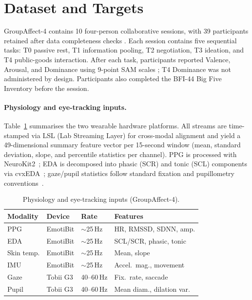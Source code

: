 \documentclass[sigconf,review,anonymous]{acmart}
\begin{document}
\section{Dataset and Targets}
\label{sec:dataset}

GroupAffect-4 contains 10 four-person collaborative sessions, with 39
participants retained after data completeness checks \cite{groupaffect4}.
Each session contains five sequential tasks: T0 passive rest, T1 information
pooling, T2 negotiation, T3 ideation, and T4 public-goods interaction.
After each task, participants reported Valence, Arousal, and Dominance using
9-point SAM scales \cite{bradley1994sam}; T4 Dominance was not administered
by design.
Participants also completed the BFI-44 Big Five Inventory
\cite{john1999bigfive} before the session.

\paragraph{Physiology and eye-tracking inputs.}
Table~\ref{tab:modalities} summarises the two wearable hardware platforms.
All streams are time-stamped via LSL (Lab Streaming Layer) for cross-modal
alignment and yield a 49-dimensional summary feature vector per 15-second
window (mean, standard deviation, slope, and percentile statistics per
channel).
PPG is processed with NeuroKit2~\cite{makowski2021neurokit2}; EDA is
decomposed into phasic (SCR) and tonic (SCL) components via
cvxEDA~\cite{greco2016cvxeda}; gaze/pupil statistics follow standard
fixation and pupillometry conventions~\cite{laeng2012pupillometry}.

\begin{table}[t]
\caption{Physiology and eye-tracking inputs (GroupAffect-4).}
\label{tab:modalities}
\centering
\setlength{\tabcolsep}{3pt}
\footnotesize
\begin{tabular}{>{}l >{}l >{}l >{}l}
\toprule
\textbf{Modality} & \textbf{Device} & \textbf{Rate} & \textbf{Features} \\
\midrule
PPG        & EmotiBit & $\sim$25\,Hz & HR, RMSSD, SDNN, amp. \\
EDA        & EmotiBit & $\sim$25\,Hz & SCL/SCR, phasic, tonic \\
Skin temp. & EmotiBit & $\sim$25\,Hz & Mean, slope \\
IMU        & EmotiBit & $\sim$25\,Hz & Accel.~mag., movement \\
Gaze       & Tobii G3 & 40--60\,Hz   & Fix.~rate, saccade \\
Pupil      & Tobii G3 & 40--60\,Hz   & Mean diam., dilation var. \\
\bottomrule
\end{tabular}
\end{table}
\end{document}
